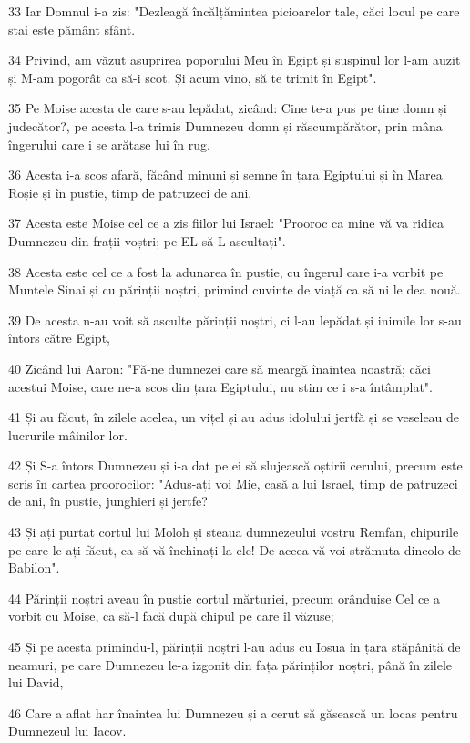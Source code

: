 \par 33 Iar Domnul i-a zis: "Dezleagă încălțămintea picioarelor tale, căci locul pe care stai este pământ sfânt.
\par 34 Privind, am văzut asuprirea poporului Meu în Egipt și suspinul lor l-am auzit și M-am pogorât ca să-i scot. Și acum vino, să te trimit în Egipt".
\par 35 Pe Moise acesta de care s-au lepădat, zicând: Cine te-a pus pe tine domn și judecător?, pe acesta l-a trimis Dumnezeu domn și răscumpărător, prin mâna îngerului care i se arătase lui în rug.
\par 36 Acesta i-a scos afară, făcând minuni și semne în țara Egiptului și în Marea Roșie și în pustie, timp de patruzeci de ani.
\par 37 Acesta este Moise cel ce a zis fiilor lui Israel: "Prooroc ca mine vă va ridica Dumnezeu din frații voștri; pe EL să-L ascultați".
\par 38 Acesta este cel ce a fost la adunarea în pustie, cu îngerul care i-a vorbit pe Muntele Sinai și cu părinții noștri, primind cuvinte de viață ca să ni le dea nouă.
\par 39 De acesta n-au voit să asculte părinții noștri, ci l-au lepădat și inimile lor s-au întors către Egipt,
\par 40 Zicând lui Aaron: "Fă-ne dumnezei care să meargă înaintea noastră; căci acestui Moise, care ne-a scos din țara Egiptului, nu știm ce i s-a întâmplat".
\par 41 Și au făcut, în zilele acelea, un vițel și au adus idolului jertfă și se veseleau de lucrurile mâinilor lor.
\par 42 Și S-a întors Dumnezeu și i-a dat pe ei să slujească oștirii cerului, precum este scris în cartea proorocilor: "Adus-ați voi Mie, casă a lui Israel, timp de patruzeci de ani, în pustie, junghieri și jertfe?
\par 43 Și ați purtat cortul lui Moloh și steaua dumnezeului vostru Remfan, chipurile pe care le-ați făcut, ca să vă închinați la ele! De aceea vă voi strămuta dincolo de Babilon".
\par 44 Părinții noștri aveau în pustie cortul mărturiei, precum orânduise Cel ce a vorbit cu Moise, ca să-l facă după chipul pe care îl văzuse;
\par 45 Și pe acesta primindu-l, părinții noștri l-au adus cu Iosua în țara stăpânită de neamuri, pe care Dumnezeu le-a izgonit din fața părinților noștri, până în zilele lui David,
\par 46 Care a aflat har înaintea lui Dumnezeu și a cerut să găsească un locaș pentru Dumnezeul lui Iacov.
